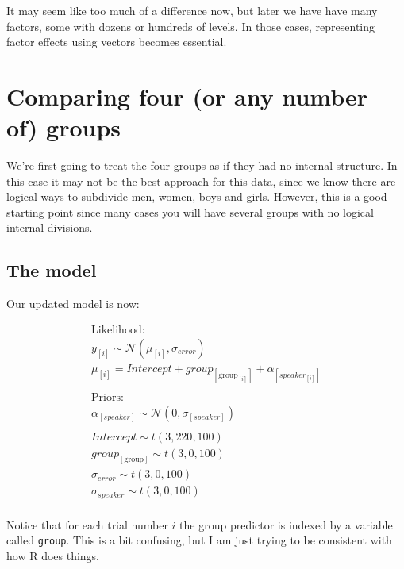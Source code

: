 \documentclass[
]{book}
\begin{document}
It may seem like too much of a difference now, but later we have have many factors, some with dozens or hundreds of levels. In those cases, representing factor effects using vectors becomes essential.

\hypertarget{comparing-four-or-any-number-of-groups}{%
\section{Comparing four (or any number of) groups}\label{comparing-four-or-any-number-of-groups}}

We're first going to treat the four groups as if they had no internal structure. In this case it may not be the best approach for this data, since we know there are logical ways to subdivide men, women, boys and girls. However, this is a good starting point since many cases you will have several groups with no logical internal divisions.

\hypertarget{the-model}{%
\subsection{The model}\label{the-model}}

Our updated model is now:

\begin{equation}
\begin{split}
\textrm{Likelihood:} \\
y_{[i]} \sim \mathcal{N}(\mu_{[i]},\sigma_{error}) \\
\mu_{[i]} = Intercept + group_{[\mathrm{group}_{[i]}]} + \alpha_{[speaker_{[i]}]} \\\\
\textrm{Priors:} \\
\alpha_{[speaker]} \sim \mathcal{N}(0,\sigma_{[speaker]}) \\ \\ 
Intercept \sim t(3, 220, 100) \\ 
group_{[\mathrm{group}]} \sim t(3, 0, 100) \\ 
\sigma_{error} \sim t(3, 0, 100) \\
\sigma_{speaker} \sim t(3, 0, 100) \\ 
\end{split}
\label{eq:41}
\end{equation}

Notice that for each trial number \(i\) the group predictor is indexed by a variable called \texttt{group}. This is a bit confusing, but I am just trying to be consistent with how R does things.
\end{document}
